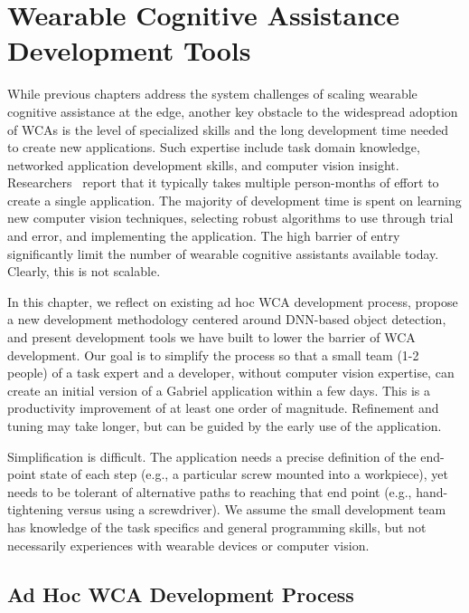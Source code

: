 \chapter{Wearable Cognitive Assistance Development Tools}
\label{chapter: app-dev}

While previous chapters address the system challenges of scaling wearable
cognitive assistance at the edge, another key obstacle to the widespread
adoption of WCAs is the level of specialized skills and the long development
time needed to create new applications. Such expertise include task domain
knowledge, networked application development skills, and computer vision
insight. Researchers~\cite{chen2018application} report that it typically takes
multiple person-months of effort to create a single application. The majority of
development time is spent on learning new computer vision techniques, selecting
robust algorithms to use through trial and error, and implementing the
application. The high barrier of entry significantly limit the number of
wearable cognitive assistants available today. Clearly, this is not scalable. 

In this chapter, we reflect on existing ad hoc WCA development process, propose
a new development methodology centered around DNN-based object detection, and
present development tools we have built to lower the barrier of WCA development.
Our goal is to simplify the process so that a small team (1-2 people) of a task
expert and a developer, without computer vision expertise, can create an initial
version of a Gabriel application within a few days. This is a productivity
improvement of at least one order of magnitude. Refinement and tuning may take
longer, but can be guided by the early use of the application. 

Simplification is difficult. The application needs a precise definition of the
end-point state of each step (e.g., a particular screw mounted into a
workpiece), yet needs to be tolerant of alternative paths to reaching that end
point (e.g., hand-tightening versus using a screwdriver). We assume the small
development team has knowledge of the task specifics and general programming
skills, but not necessarily experiences with wearable devices or computer
vision.

\section{Ad Hoc WCA Development Process}
\label{sec: app-dev-adhoc}

